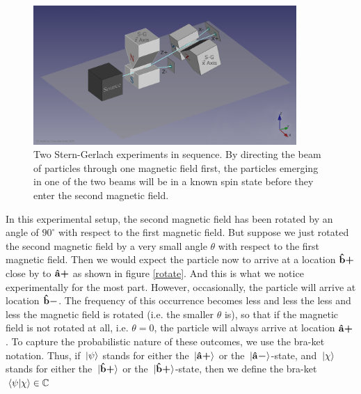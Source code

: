 \begin{figure}[ht!]
\captionsetup{justification=centering}
\centering
\includegraphics[width=100mm]{Chapter01/1920px-Stern-Gerlach_Analyzer_Sequential_Series_E2v.png}
\vspace*{10px}
\caption[Two Stern-Gerlach experiments in sequence]{Two Stern-Gerlach experiments in sequence. By directing the beam of particles through one magnetic field first, the particles emerging in one of the two beams will be in a known spin state before they enter the second magnetic field.\protect\footnotemark}
\label{knownspin}
\end{figure}
 In this experimental setup, the second magnetic field has been rotated by an angle of $90^\circ$ with respect to the first magnetic field. But suppose we just rotated the second magnetic field by a very small angle $\theta$ with respect to the first magnetic field. Then we would expect the particle now to arrive at a location  ${\vb{\hat{{b}}}\bm{+}}$ close by to ${\vb{\hat{{a}}}\bm{+}}$ as shown in figure \ref{rotate}. And this is what we notice experimentally for the most part. However, occasionally, the particle will arrive at location ${\vb{\hat{{b}}}\bm{-}}$. The frequency of this occurrence becomes less and less the less and less the magnetic field is rotated (i.e. the smaller $\theta$ is), so that if the magnetic field is not rotated at all, i.e. $\theta=0$, the particle will always arrive at location ${\vb{\hat{{a}}}\bm{+}}$. 
To capture the probabilistic nature of these outcomes, we use the bra-ket notation. Thus, if $\ket*{\psi}$ stands for either the $\ket*{{\vb{\hat{{a}}}\bm{+}}}$ or the $\ket*{{\vb{\hat{{a}}}\bm{-}}}$-state, and $\ket*{\chi}$ stands for either the $\ket*{{\vb{\hat{{b}}}\bm{+}}}$ or the $\ket*{{\vb{\hat{{b}}}\bm{+}}}$-state, then we define the bra-ket $\ip*{\psi}{\chi}\in\mathbb{C}$  %
